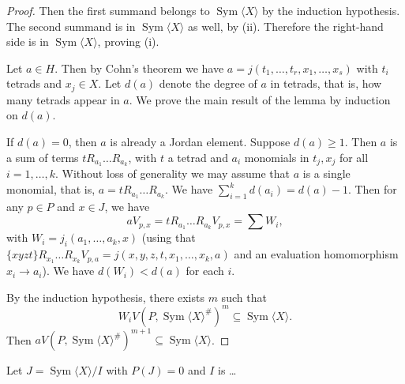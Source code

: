 \documentclass{article}
\begin{document}
\begin{proof}
Then the first summand belongs to $\operatorname{Sym}\langle X \rangle$ by the induction hypothesis. The second summand is in $\operatorname{Sym}\langle X \rangle$ as well, by (ii). Therefore the right-hand side is in $\operatorname{Sym}\langle X \rangle$, proving (i).

Let $a \in H$. Then by Cohn's theorem we have $a = j(t_1,\dots,t_r, x_1,\dots,x_s)$ with $t_i$ tetrads and $x_j \in X$. Let $d(a)$ denote the degree of $a$ in tetrads, that is, how many tetrads appear in $a$. We prove the main result of the lemma by induction on $d(a)$.

If $d(a)=0$, then $a$ is already a Jordan element. Suppose $d(a) \geq 1$. Then $a$ is a sum of terms $t R_{a_1} \dots R_{a_k}$, with $t$ a tetrad and $a_i$ monomials in $t_j, x_j$ for all $i=1,\dots,k$. Without loss of generality we may assume that $a$ is a single monomial, that is, $a = t R_{a_1} \dots R_{a_k}$. We have $\sum_{i=1}^k d(a_i) = d(a)-1$. Then for any $p \in P$ and $x \in J$, we have
\[
a V_{p,x} = t R_{a_1} \dots R_{a_k} V_{p,x} = \sum W_i,
\]
with $W_i = j_i(a_1,\dots,a_k,x)$ (using that $\{xyzt\} R_{x_1} \dots R_{x_k} V_{p,a} = j(x,y,z,t,x_1,\dots,x_k,a)$ and an evaluation homomorphism $x_i \to a_i$). We have $d(W_i) < d(a)$ for each $i$.

By the induction hypothesis, there exists $m$ such that
\[
W_i V(P, \operatorname{Sym}\langle X \rangle^{\#})^{m} \subseteq \operatorname{Sym}\langle X \rangle.
\]
Then $a V(P, \operatorname{Sym}\langle X \rangle^{\#})^{m+1} \subseteq \operatorname{Sym}\langle X \rangle$.
\end{proof}

Let $J = \operatorname{Sym}\langle X \rangle / I$ with $P(J)=0$ and $I$ is \dots
\end{document}
